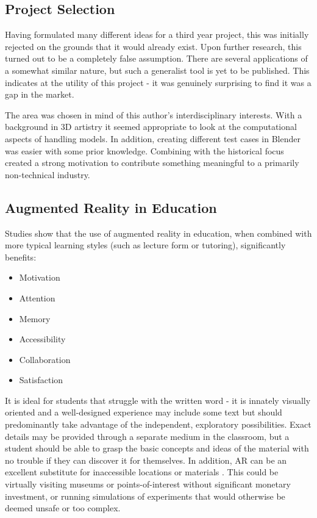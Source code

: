\documentclass[12pt, a4paper]{article}
\begin{document}
\newpage
\subsection{Project Selection}
Having formulated many different ideas for a third year project, this was initially rejected on the grounds that it would already exist. Upon further research, this turned out to be a completely false assumption. There are several applications of a somewhat similar nature, but such a generalist tool is yet to be published. This indicates at the utility of this project - it was genuinely surprising to find it was a gap in the market.

The area was chosen in mind of this author's interdisciplinary interests. With a background in 3D artistry it seemed appropriate to look at the computational aspects of handling models. In addition, creating different test cases in Blender was easier with some prior knowledge. Combining with the historical focus created a strong motivation to contribute something meaningful to a primarily non-technical industry.

\subsection{Augmented Reality in Education}
Studies show that the use of augmented reality in education, when combined with more typical learning styles (such as lecture form or tutoring), significantly benefits: \cite{education:ARlit}

\begin{multicols}{2}
    \begin{itemize}
    \item Motivation
    \item Attention
    \item Memory
    \item Accessibility
    \item Collaboration
    \item Satisfaction
    \end{itemize}
\end{multicols}

It is ideal for students that struggle with the written word \cite{education:class} - it is innately visually oriented and a well-designed experience may include some text but should predominantly take advantage of the independent, exploratory possibilities. Exact details may be provided through a separate medium in the classroom, but a student should be able to grasp the basic concepts and ideas of the material with no trouble if they can discover it for themselves. In addition, AR can be an excellent substitute for inaccessible locations or materials \cite{education:placespotentials}. This could be virtually visiting museums or points-of-interest without significant monetary investment, or running simulations of experiments that would otherwise be deemed unsafe or too complex.
\end{document}
